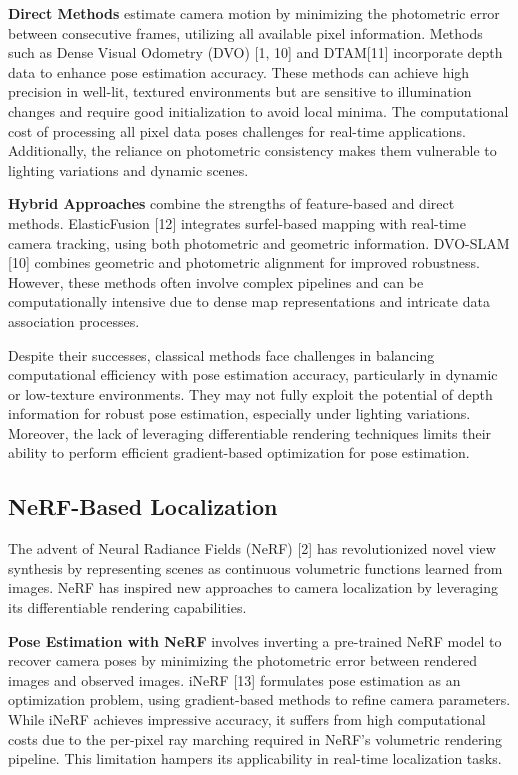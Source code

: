 \documentclass[twocolumn]{article} %
\begin{document}
\textbf{Direct Methods} estimate camera motion by minimizing the
photometric error between consecutive frames, utilizing all available
pixel information. Methods such as Dense Visual Odometry (DVO) {[}1,
10{]} and DTAM{[}11{]} incorporate depth data to enhance pose estimation
accuracy. These methods can achieve high precision in well-lit, textured
environments but are sensitive to illumination changes and require good
initialization to avoid local minima. The computational cost of
processing all pixel data poses challenges for real-time applications.
Additionally, the reliance on photometric consistency makes them
vulnerable to lighting variations and dynamic scenes.

\textbf{Hybrid Approaches} combine the strengths of feature-based and
direct methods. ElasticFusion {[}12{]} integrates surfel-based mapping
with real-time camera tracking, using both photometric and geometric
information. DVO-SLAM {[}10{]} combines geometric and photometric
alignment for improved robustness. However, these methods often involve
complex pipelines and can be computationally intensive due to dense map
representations and intricate data association processes.

Despite their successes, classical methods face challenges in balancing
computational efficiency with pose estimation accuracy, particularly in
dynamic or low-texture environments. They may not fully exploit the
potential of depth information for robust pose estimation, especially
under lighting variations. Moreover, the lack of leveraging
differentiable rendering techniques limits their ability to perform
efficient gradient-based optimization for pose estimation.

\subsection{NeRF-Based Localization}\label{nerf-based-localization}

The advent of Neural Radiance Fields (NeRF) {[}2{]} has revolutionized
novel view synthesis by representing scenes as continuous volumetric
functions learned from images. NeRF has inspired new approaches to
camera localization by leveraging its differentiable rendering
capabilities.

\textbf{Pose Estimation with NeRF} involves inverting a pre-trained NeRF
model to recover camera poses by minimizing the photometric error
between rendered images and observed images. iNeRF {[}13{]} formulates
pose estimation as an optimization problem, using gradient-based methods
to refine camera parameters. While iNeRF achieves impressive accuracy,
it suffers from high computational costs due to the per-pixel ray
marching required in NeRF's volumetric rendering pipeline. This
limitation hampers its applicability in real-time localization tasks.
\end{document}
